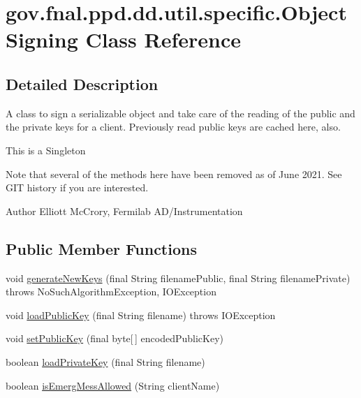 \hypertarget{classgov_1_1fnal_1_1ppd_1_1dd_1_1util_1_1specific_1_1ObjectSigning}{\section{gov.\-fnal.\-ppd.\-dd.\-util.\-specific.\-Object\-Signing Class Reference}
\label{classgov_1_1fnal_1_1ppd_1_1dd_1_1util_1_1specific_1_1ObjectSigning}
}


\subsection{Detailed Description}
A class to sign a serializable object and take care of the reading of the public and the private keys for a client. Previously read public keys are cached here, also. 

This is a Singleton 

Note that several of the methods here have been removed as of June 2021. See G\-I\-T history if you are interested. 

\begin{DoxyAuthor}{Author}
Elliott Mc\-Crory, Fermilab A\-D/\-Instrumentation 
\end{DoxyAuthor}
\subsection*{Public Member Functions}
\begin{DoxyCompactItemize}
\item 
void \hyperlink{classgov_1_1fnal_1_1ppd_1_1dd_1_1util_1_1specific_1_1ObjectSigning_af0b44b53a18273c1ac9b2965e62c496e}{generate\-New\-Keys} (final String filename\-Public, final String filename\-Private)  throws No\-Such\-Algorithm\-Exception, I\-O\-Exception 
\item 
void \hyperlink{classgov_1_1fnal_1_1ppd_1_1dd_1_1util_1_1specific_1_1ObjectSigning_adb2220ffd868f2c90669a60e103eabfe}{load\-Public\-Key} (final String filename)  throws I\-O\-Exception 
\item 
void \hyperlink{classgov_1_1fnal_1_1ppd_1_1dd_1_1util_1_1specific_1_1ObjectSigning_a28634898ffa14ba174a785f3a40cb1de}{set\-Public\-Key} (final byte\mbox{[}$\,$\mbox{]} encoded\-Public\-Key)
\item 
boolean \hyperlink{classgov_1_1fnal_1_1ppd_1_1dd_1_1util_1_1specific_1_1ObjectSigning_ad05b0cd592f8f25aa296a80928f31cc7}{load\-Private\-Key} (final String filename)
\item 
boolean \hyperlink{classgov_1_1fnal_1_1ppd_1_1dd_1_1util_1_1specific_1_1ObjectSigning_a561eedb67812a4082d737ec182fe288c}{is\-Emerg\-Mess\-Allowed} (String client\-Name)
\end{DoxyCompactItemize}

